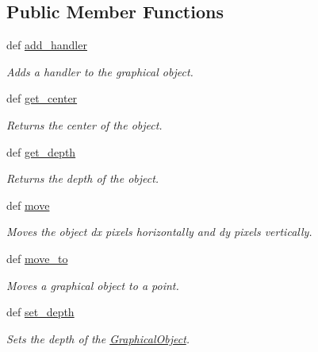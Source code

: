 \subsection*{Public Member Functions}
\begin{DoxyCompactItemize}
\item 
def \hyperlink{classcs110graphics_1_1GraphicalObject_adb1af0d5a6baae3f9a08d21a3227c49f}{add\_\-handler}
\begin{DoxyCompactList}\small\item\em Adds a handler to the graphical object. \item\end{DoxyCompactList}\item 
def \hyperlink{classcs110graphics_1_1GraphicalObject_a062789c4cc9de38af32dcc4ff2058607}{get\_\-center}
\begin{DoxyCompactList}\small\item\em Returns the center of the object. \item\end{DoxyCompactList}\item 
def \hyperlink{classcs110graphics_1_1GraphicalObject_a6d9f5718cd0cf249e0d2842971bae17f}{get\_\-depth}
\begin{DoxyCompactList}\small\item\em Returns the depth of the object. \item\end{DoxyCompactList}\item 
def \hyperlink{classcs110graphics_1_1GraphicalObject_aa64d270fb83efa4a54e1a7953512f9cd}{move}
\begin{DoxyCompactList}\small\item\em Moves the object dx pixels horizontally and dy pixels vertically. \item\end{DoxyCompactList}\item 
def \hyperlink{classcs110graphics_1_1GraphicalObject_abe2d480265df7ac9447205c52c6946df}{move\_\-to}
\begin{DoxyCompactList}\small\item\em Moves a graphical object to a point. \item\end{DoxyCompactList}\item 
def \hyperlink{classcs110graphics_1_1GraphicalObject_a20d76d4ee4419c3065d61deb6cbc6700}{set\_\-depth}
\begin{DoxyCompactList}\small\item\em Sets the depth of the \hyperlink{classcs110graphics_1_1GraphicalObject}{GraphicalObject}. \item\end{DoxyCompactList}\end{DoxyCompactItemize}


